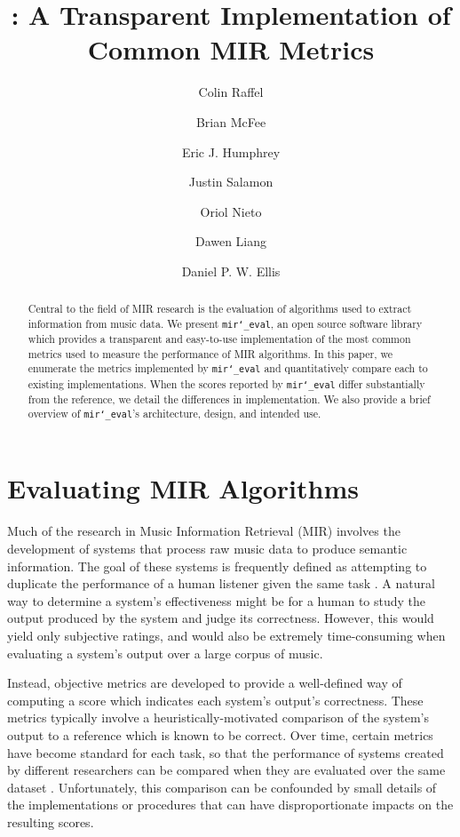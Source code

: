 \documentclass{article}
\title{\mireval{}: A Transparent Implementation of Common MIR Metrics}
\author[1]{Colin Raffel}
\author[1]{Brian McFee}
\author[2]{Eric J. Humphrey}
\author[2]{Justin Salamon}
\author[2]{Oriol Nieto}
\author[1]{Dawen Liang}
\author[1]{Daniel P. W. Ellis}
\affil[1]{LabROSA, Dept. of Electrical Engineering\\Columbia University, New York}
\affil[2]{Music and Audio Research Lab\\New York University, New York}
\def\mireval{\texttt{mir\char`_eval}}
\begin{document}
%
\maketitle
%
\begin{abstract}
Central to the field of MIR research is the evaluation of algorithms used to extract information from music data.
We present \mireval{}, an open source software library which provides a transparent and easy-to-use implementation of the most common metrics used to measure the performance of MIR algorithms.
In this paper, we enumerate the metrics implemented by \mireval{} and quantitatively compare each to  existing implementations.
When the scores reported by \mireval{} differ substantially from the reference, we detail the differences in implementation.
We also provide a brief overview of \mireval{}'s architecture, design, and intended use.
\end{abstract}
%
\section{Evaluating MIR Algorithms}

Much of the research in Music Information Retrieval (MIR) involves the development of systems that process raw music data to produce semantic information.
The goal of these systems is frequently defined as attempting to duplicate the performance of a human listener given the same task \cite{downie2003toward}.
A natural way to determine a system's effectiveness might be for a human to study the output produced by the system and judge its correctness.
However, this would yield only subjective ratings, and would also be extremely time-consuming when evaluating a system's output over a large corpus of music.

Instead, objective metrics are developed to provide a well-defined way of computing a score which indicates each system's output's correctness.
These metrics typically involve a heuristically-motivated comparison of the system's output to a reference which is known to be correct.
Over time, certain metrics have become standard for each task, so that the performance of systems created by different researchers can be compared when they are evaluated over the same dataset \cite{downie2003toward}.
Unfortunately, this comparison can be confounded by small details of the implementations or procedures that can have disproportionate impacts on the resulting scores.
\end{document}
